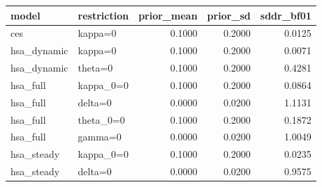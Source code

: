 \begin{tabular}{llrrr}
\toprule
model & restriction & prior\_mean & prior\_sd & sddr\_bf01 \\
\midrule
ces & kappa=0 & 0.1000 & 0.2000 & 0.0125 \\
hsa\_dynamic & kappa=0 & 0.1000 & 0.2000 & 0.0071 \\
hsa\_dynamic & theta=0 & 0.1000 & 0.2000 & 0.4281 \\
hsa\_full & kappa\_0=0 & 0.1000 & 0.2000 & 0.0864 \\
hsa\_full & delta=0 & 0.0000 & 0.0200 & 1.1131 \\
hsa\_full & theta\_0=0 & 0.1000 & 0.2000 & 0.1872 \\
hsa\_full & gamma=0 & 0.0000 & 0.0200 & 1.0049 \\
hsa\_steady & kappa\_0=0 & 0.1000 & 0.2000 & 0.0235 \\
hsa\_steady & delta=0 & 0.0000 & 0.0200 & 0.9575 \\
\bottomrule
\end{tabular}
